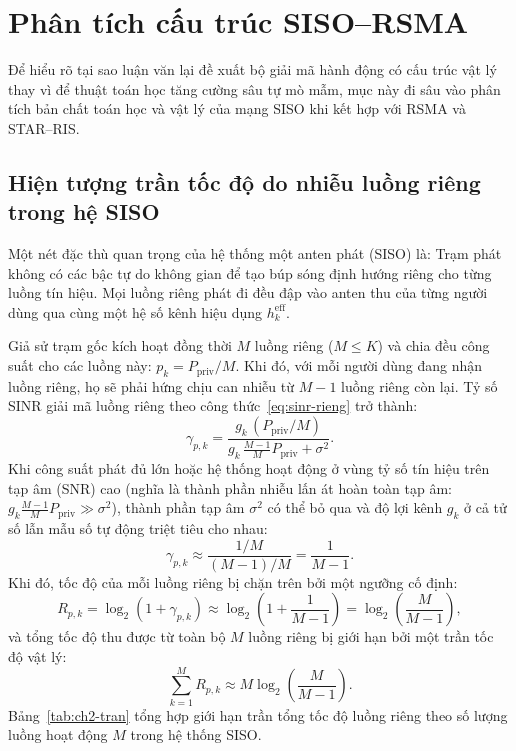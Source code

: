 \section{Phân tích cấu trúc SISO--RSMA}
\label{sec:phan-tich-cau-truc}

Để hiểu rõ tại sao luận văn lại đề xuất bộ giải mã hành động có cấu trúc vật lý thay vì để thuật toán học
tăng cường sâu tự mò mẫm, mục này đi sâu vào phân tích bản chất toán học và vật lý của mạng SISO khi kết hợp
với RSMA và STAR--RIS.

\subsection{Hiện tượng trần tốc độ do nhiễu luồng riêng trong hệ SISO}
\label{ssec:nhieu-luong-rieng}

Một nét đặc thù quan trọng của hệ thống một anten phát (SISO) là: Trạm phát không có các bậc tự do không gian
để tạo búp sóng định hướng riêng cho từng luồng tín hiệu. Mọi luồng riêng phát đi đều đập vào anten thu của
từng người dùng qua cùng một hệ số kênh hiệu dụng $h^{\mathrm{eff}}_k$.

Giả sử trạm gốc kích hoạt đồng thời $M$ luồng riêng ($M \le K$) và chia đều công suất cho các luồng này:
$p_k = P_{\mathrm{priv}}/M$. Khi đó, với mỗi người dùng đang nhận luồng riêng, họ sẽ phải hứng chịu can nhiễu
từ $M - 1$ luồng riêng còn lại. Tỷ số SINR giải mã luồng riêng theo công thức~\eqref{eq:sinr-rieng} trở
thành:
\begin{equation}
\gamma_{p,k} = \frac{g_k\, (P_{\mathrm{priv}}/M)}{g_k\, \frac{M-1}{M} P_{\mathrm{priv}} + \sigma^2} .
\label{eq:sinr-m-luong}
\end{equation}
Khi công suất phát đủ lớn hoặc hệ thống hoạt động ở vùng tỷ số tín hiệu trên tạp âm (SNR) cao (nghĩa là
thành phần nhiễu lấn át hoàn toàn tạp âm: $g_k \frac{M-1}{M} P_{\mathrm{priv}} \gg \sigma^2$), thành phần tạp
âm $\sigma^2$ có thể bỏ qua và độ lợi kênh $g_k$ ở cả tử số lẫn mẫu số tự động triệt tiêu cho nhau:
\begin{equation}
\gamma_{p,k} \approx \frac{1/M}{(M-1)/M} = \frac{1}{M-1} .
\label{eq:sinr-tiem-can}
\end{equation}
Khi đó, tốc độ của mỗi luồng riêng bị chặn trên bởi một ngưỡng cố định:
\begin{equation}
R_{p,k} = \log_2(1 + \gamma_{p,k}) \approx \log_2\!\left(1 + \frac{1}{M-1}\right)
= \log_2\!\left(\frac{M}{M-1}\right),
\label{eq:toc-do-tiem-can}
\end{equation}
và tổng tốc độ thu được từ toàn bộ $M$ luồng riêng bị giới hạn bởi một trần tốc độ vật lý:
\begin{equation}
\sum_{k=1}^{M} R_{p,k} \approx M \log_2\!\left(\frac{M}{M-1}\right).
\label{eq:xap-xi-nhieu}
\end{equation}
Bảng~\ref{tab:ch2-tran} tổng hợp giới hạn trần tổng tốc độ luồng riêng theo số lượng luồng hoạt động $M$
trong hệ thống SISO.

